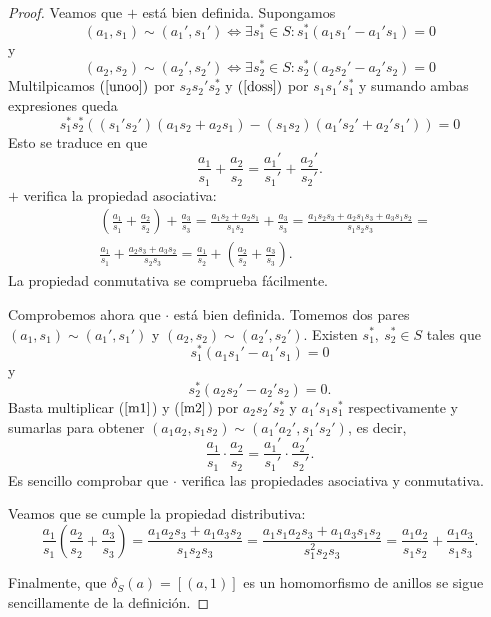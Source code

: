\documentclass[../main.tex]{subfiles}
\begin{document}
\begin{proof}
Veamos que $+$ está bien definida. Supongamos\begin{equation}\label{unoo}
    (a_1,s_1)\sim (a_1',s_1')\iff \exists s_1^{\ast}\in S : s_1^{\ast}(a_1s_1'-a_1's_1)=0
\end{equation} y \begin{equation}\label{doss}
    (a_2,s_2)\sim (a_2',s_2')\iff \exists s_2^{\ast}\in S : s_2^{\ast}(a_2s_2'-a_2's_2)=0
\end{equation}
Multilpicamos $(\ref{unoo})$ por $s_2s_2's_2^{\ast}$ y $(\ref{doss})$ por $s_1s_1's_1^{\ast}$ y sumando ambas expresiones queda $$s_1^{\ast}s_2^{\ast}((s_1's_2')(a_1s_2+a_2s_1)-(s_1s_2)(a_1's_2'+a_2's_1'))=0$$ Esto se traduce en que $$\frac{a_1}{s_1} + \frac{a_2}{s_2}=\frac{a_1'}{s_1'} + \frac{a_2'}{s_2'}.$$
$+$ verifica la propiedad asociativa:
\begin{align*}
    &\left(\frac{a_1}{s_1}+\frac{a_2}{s_2}\right)+\frac{a_3}{s_3}=\frac{a_1s_2+a_2s_1}{s_1s_2}+\frac{a_3}{s_3}=\frac{a_1s_2s_3+a_2s_1s_3+a_3s_1s_2}{s_1s_2s_3}=\\&\frac{a_1}{s_1}+\frac{a_2s_3+a_3s_2}{s_2s_3}=\frac{a_1}{s_2}+\left(\frac{a_2}{s_2}+\frac{a_3}{s_3}\right).
\end{align*}
La propiedad conmutativa se comprueba fácilmente.

Comprobemos ahora que $·$ está bien definida. Tomemos dos pares $(a_1,s_1)\sim(a_1',s_1')$ y $(a_2,s_2)\sim(a_2',s_2')$. Existen $s_1^*,\ s_2^*\in S$ tales que
\begin{equation}\label{m1}
    s_1^{\ast}(a_1s_1'-a_1's_1)=0
\end{equation} y \begin{equation}\label{m2}
    s_2^{\ast}(a_2s_2'-a_2's_2)=0.
\end{equation}
Basta multiplicar ($\ref{m1}$) y ($\ref{m2}$) por $a_2s_2's_2^*$ y $a_1's_1s_1^*$ respectivamente y sumarlas para obtener $(a_1a_2,s_1s_2)\sim(a_1'a_2',s_1's_2')$, es decir,
$$\frac{a_1}{s_1}·\frac{a_2}{s_2}=\frac{a_1'}{s_1'}·\frac{a_2'}{s_2'}.$$
Es sencillo comprobar que $\cdot$ verifica las propiedades asociativa y conmutativa.

Veamos que se cumple la propiedad distributiva:$$\frac{a_1}{s_1}\left(\frac{a_2}{s_2}+\frac{a_3}{s_3}\right)=\frac{a_1a_2s_3+a_1a_3s_2}{s_1s_2s_3}=\frac{a_1s_1a_2s_3+a_1a_3s_1s_2}{s_1^2s_2s_3}=\frac{a_1a_2}{s_1s_2}+\frac{a_1a_3}{s_1s_3}.$$

Finalmente, que $\delta_S(a)=[(a,1)]$ es un homomorfismo de anillos se sigue sencillamente de la definición.
\end{proof}
\end{document}
